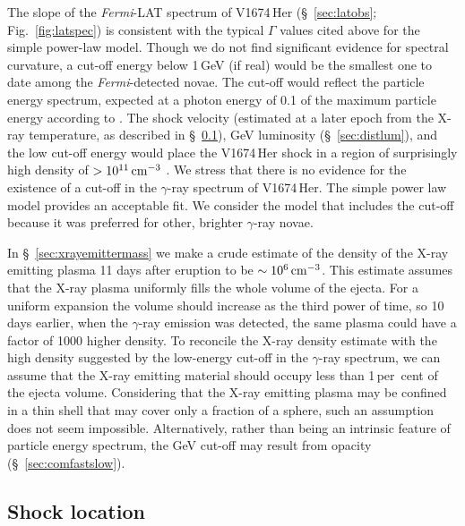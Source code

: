 \documentclass[a4paper,fleqn,usenatbib]{mnras}
\newcommand{\nova}{V1674\,Her}
\newcommand{\fermilat}{\emph{Fermi}-LAT}
\begin{document}
The slope of the \fermilat{} spectrum of \nova{} (\S~\ref{sec:latobs}; Fig.~\ref{fig:latspec}) 
is consistent with the typical $\Gamma$ values cited above for the simple power-law model.
Though we do not find significant evidence for spectral curvature, 
a cut-off energy below 1\,GeV (if real) would be the smallest one to date among the {\em Fermi}-detected novae.
The cut-off would reflect the particle energy spectrum, expected at a photon energy of 0.1 of the maximum particle energy according to \cite{2016MNRAS.457.1786M}.
The shock velocity (estimated at a later epoch from the X-ray temperature, 
as described in \S~\ref{sec:shocklocation}), GeV luminosity (\S~\ref{sec:distlum}), 
and the low cut-off energy would place the \nova{} shock in a region of
surprisingly high density of $>10^{11}\,{\rm cm}^{-3}$
\citep[see Fig.~3 of][]{2016MNRAS.457.1786M}.
We stress that there is no evidence for the existence of a cut-off in 
the $\gamma$-ray spectrum of \nova{}. The simple power law model provides an acceptable fit. 
We consider the model that includes the cut-off because it was preferred for other, brighter $\gamma$-ray novae.

In \S~\ref{sec:xrayemittermass} we make a crude estimate of the density of
the X-ray emitting plasma 11 days after eruption to be $\sim10^{6}\,{\rm cm}^{-3}$.
This estimate assumes that the X-ray plasma uniformly fills the whole volume of the ejecta.
For a uniform expansion the volume should increase as the third power of
time, so 10 days earlier, when the $\gamma$-ray emission was detected, the
same plasma could have a factor of 1000 higher density. To reconcile the
X-ray density estimate with the high density suggested by the low-energy
cut-off in the $\gamma$-ray spectrum, we can assume that the X-ray emitting material 
should occupy less than 1\,per~cent of the ejecta volume. Considering that
the X-ray emitting plasma may be confined in a thin shell that may cover only
a fraction of a sphere, such an assumption does not seem impossible.
%
Alternatively, rather than being an intrinsic feature of particle energy 
spectrum, the GeV cut-off may result from opacity (\S~\ref{sec:comfastslow}).


\subsection{Shock location}
\label{sec:shocklocation}
\end{document}
